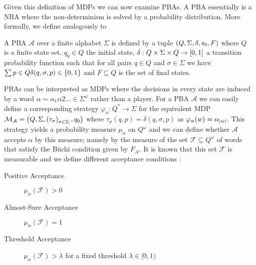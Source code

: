 Given this definition of \acp{MDP} we can now examine \acp{PBA}. A \ac{PBA}
essentially is a \ac{NBA} where the non-determinism is solved by a probability
distribution. More formally, we define analogously to \cite{Groesser}
\begin{definition}
  A \acl{PBA} $\mathcal{A}$ over a finite alphabet $\Sigma$ is defined by a
  tuple $\left(Q, \Sigma, \delta, s_{0}, F\right)$ where $Q$ is a finite state set,
  $q_{0}\in Q$ the initial state,
    $\delta:Q\times\Sigma\times Q\rightarrow \left[0,1\right]$
  a transition probability function such that for all pairs $q\in Q$ and
  $\sigma\in\Sigma$ we have $\sum{p\in Q}\delta(q,\sigma,p)\in\left\{0,1\right\}$
  and $F\subseteq Q$ is the set of final states.
\end{definition}
\acp{PBA} can be interpreted as \acp{MDP} where the decisions in every state
are induced by a word $\alpha = \alpha_{1}\alpha{2}\dots\in\Sigma^{\omega}$
rather than a player. For a \ac{PBA} $\mathcal{A}$ we can easily define a
corresponding strategy $\varphi_{\alpha}:Q^{*}\rightarrow\Sigma$ for the
equivalent \ac{MDP} $\mathcal{M}_{\mathcal{A}} =
   \left(Q, \Sigma, \left(\tau_{\sigma}\right)_{\sigma\in\Sigma}, q_{0}\right)$
where $\tau_{\sigma}(q,p) = \delta(q,\sigma,p)$ as
$\varphi_{\alpha}(w) = \alpha_{\left\vert{w}\right\vert}$. This strategy yields a probability
measure $\mu_{\alpha}$ on $Q^{\omega}$ and we can define whether $\mathcal{A}$ 
accepts $\alpha$ by this measure; namely by the measure of the set
$\mathcal{F}\subseteq Q^{\omega}$ of words that satisfy the Büchi condition
given by $F_{\mathcal{A}}$. It is known that this set $\mathcal{F}$ is
measurable and we define different acceptance conditions \cite{Groesser}:
\begin{description}
  \item [Positive Acceptance] $\mu_{\alpha}(\mathcal{F}) > 0$
  \item [Almost-Sure Acceptance] $\mu_{\alpha}(\mathcal{F}) = 1$
  \item [Threshold Acceptance] $\mu_{\alpha}(\mathcal{F}) > \lambda$ for a
    fixed threshold $\lambda\in[0, 1)$
\end{description}

